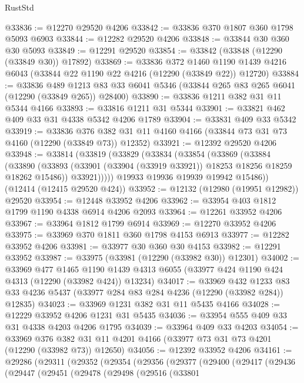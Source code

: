 \begin{lexlean}{RustStd}
\begin{coremodule}
@33836 := @12270 @29520 @4206
@33842 := @33836 @370 @1807 @360 @1798 @5093 @6903
@33844 := @12282 @29520 @4206
@33848 := @33844 @30 @360 @30 @5093
@33849 := @12291 @29520
@33854 := @33842 (@33848 (@12290 (@33849 @30)) @17892)
@33869 := @33836
    @372
    @1460
    @1190
    @1439
    @4216
    @6043
    (@33844 @22 @1190 @22 @4216 (@12290 (@33849 @22)) @12720)
@33884 := @33836
    @489
    @1213
    @83
    @33
    @6041
    @5346
    (@33844 @265 @83 @265 @6041 (@12290 (@33849 @265)) @28400)
@33890 := @33836 @1211 @382 @31 @11 @5344 @4166
@33893 := @33816 @1211 @31 @5344
@33901 := @33821 @462 @409 @33 @31 @4338 @5342 @4206 @1789
@33904 := @33831 @409 @33 @5342
@33919 := @33836
    @376
    @382
    @31
    @11
    @4160
    @4166
    (@33844 @73 @31 @73 @4160 (@12290 (@33849 @73)) @12352)
@33921 := @12392 @29520 @4206
@33948 := @33814
    (@33819
      (@33829
        (@33834
          (@33854
            (@33869
              (@33884
                (@33890
                  (@33893 (@33901 (@33904 (@33919 @33921)) @18253 @18256 @18259 @18262 @15486))
                  @33921)))))
        @19933
        @19936
        @19939
        @19942
        @15486))
    (@12414 (@12415 @29520 @424))
@33952 := @12132 (@12980 (@19951 @12982)) @29520
@33954 := @12448 @33952 @4206
@33962 := @33954 @403 @1812 @1799 @1190 @4338 @6914 @4206 @2093
@33964 := @12261 @33952 @4206
@33967 := @33964 @1812 @1799 @6914
@33969 := @12270 @33952 @4206
@33975 := @33969 @370 @1811 @360 @1798 @4153 @6913
@33977 := @12282 @33952 @4206
@33981 := @33977 @30 @360 @30 @4153
@33982 := @12291 @33952
@33987 := @33975 (@33981 (@12290 (@33982 @30)) @12301)
@34002 := @33969
    @477
    @1465
    @1190
    @1439
    @4313
    @6055
    (@33977 @424 @1190 @424 @4313 (@12290 (@33982 @424)) @13234)
@34017 := @33969
    @432
    @1233
    @83
    @33
    @4236
    @5437
    (@33977 @284 @83 @284 @4236 (@12290 (@33982 @284)) @12835)
@34023 := @33969 @1231 @382 @31 @11 @5435 @4166
@34028 := @12229 @33952 @4206 @1231 @31 @5435
@34036 := @33954 @555 @409 @33 @31 @4338 @4203 @4206 @1795
@34039 := @33964 @409 @33 @4203
@34054 := @33969
    @376
    @382
    @31
    @11
    @4201
    @4166
    (@33977 @73 @31 @73 @4201 (@12290 (@33982 @73)) @12650)
@34056 := @12392 @33952 @4206
@34161 := @29286
    (@29311
      (@29352
        (@29354
          (@29356
            (@29377
              (@29400
                (@29417
                  (@29436
                    (@29447
                      (@29451
                        (@29478
                          (@29498
                            (@29516
                              (@33801

\end{coremodule}
\end{lexlean}
